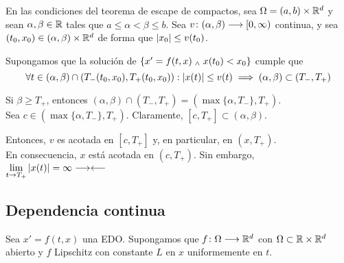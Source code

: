 \begin{cor}
	En las condiciones del teorema de escape de compactos, sea $\Omega = (a, b) \times \mathbb{R}^d$ y sean $\alpha, \beta \in \mathbb{R}$ tales que $a \leq \alpha < \beta \leq b$. Sea $v \colon (\alpha, \beta) \longrightarrow [0, \infty)$ continua, y sea $(t_0, x_0) \in (\alpha, \beta) \times \mathbb{R}^d$ de forma que $\left|x_0\right| \leq v(t_0)$.

	Supongamos que la solución de $\{x'=f(t, x) \; _{\wedge} \; x(t_0) < x_0\}$ cumple que
	\[\forall t \in (\alpha, \beta) \cap (T_-(t_0, x_0), T_+(t_0, x_0)) : \left|x(t)\right| \leq v(t) \implies (\alpha, \beta) \subset (T_-, T_+)\]
	\begin{dem}
		Si $\beta \geq T_+$, entonces $(\alpha, \beta)\cap (T_-, T_+) = (\max\{\alpha, T_-\}, T_+)$. \\
		Sea $c\in (\max\{\alpha, T_-\}, T_+)$. Claramente, $[c, T_+]\subset(\alpha, \beta)$.

		Entonces, $v$ es acotada en $[c, T_+]$  y, en particular, en $(x, T_+)$.\\
		En consecuencia, $x$ está acotada en $(c, T_+)$. Sin embargo, $\displaystyle \lim_{t\to T_+} |x(t)| = \infty \longrightarrow\longleftarrow$
	\end{dem}
\end{cor}

\subsection{Dependencia continua}

Sea $x'=f(t, x)$ una EDO. Supongamos que $f \colon \Omega \longrightarrow \mathbb{R}^d$ con $\Omega \subset \mathbb{R}\times\mathbb{R}^d$ abierto y $f$ Lipschitz con constante $L$ en $x$ uniformemente en $t$.

